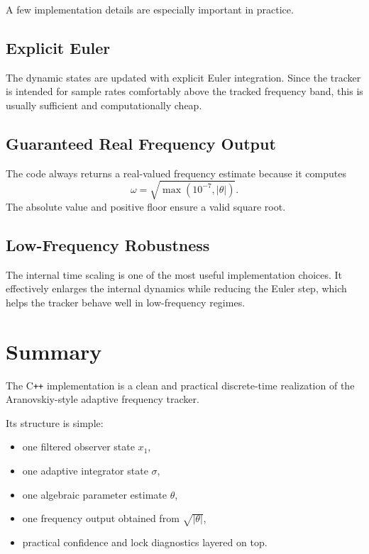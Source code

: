 \documentclass[conference]{IEEEtran}
\begin{document}
    A few implementation details are especially important in practice.

    \subsection{Explicit Euler}

    The dynamic states are updated with explicit Euler integration. Since the
    tracker is intended for sample rates comfortably above the tracked frequency
    band, this is usually sufficient and computationally cheap.

    \subsection{Guaranteed Real Frequency Output}

    The code always returns a real-valued frequency estimate because it computes
    \begin{equation}
        \omega = \sqrt{\max(10^{-7}, |\theta|)}.
    \end{equation}
    The absolute value and positive floor ensure a valid square root.

    \subsection{Low-Frequency Robustness}

    The internal time scaling is one of the most useful implementation choices.
    It effectively enlarges the internal dynamics while reducing the Euler step,
    which helps the tracker behave well in low-frequency regimes.

    \section{Summary}

    The C\texttt{++} implementation is a clean and practical discrete-time
    realization of the Aranovskiy-style adaptive frequency tracker.

    Its structure is simple:
    \begin{itemize}
        \item one filtered observer state $x_1$,
        \item one adaptive integrator state $\sigma$,
        \item one algebraic parameter estimate $\theta$,
        \item one frequency output obtained from $\sqrt{|\theta|}$,
        \item practical confidence and lock diagnostics layered on top.
    \end{itemize}
\end{document}
